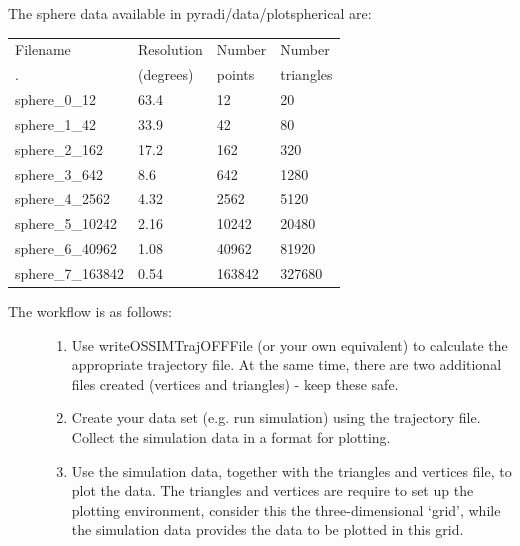 \documentclass[a4paper,10pt,english]{sphinxmanual}
\begin{document}
The sphere data available in pyradi/data/plotspherical are:

\begin{tabulary}{\linewidth}{|L|L|L|L|}
\hline
\textsf{\relax 
Filename
} & \textsf{\relax 
Resolution
} & \textsf{\relax 
Number
} & \textsf{\relax 
Number
}\\
\textsf{\relax 
.
} & \textsf{\relax 
(degrees)
} & \textsf{\relax 
points
} & \textsf{\relax 
triangles
}\\
\hline
sphere\_0\_12
 & 
63.4
 & 
12
 & 
20
\\

sphere\_1\_42
 & 
33.9
 & 
42
 & 
80
\\

sphere\_2\_162
 & 
17.2
 & 
162
 & 
320
\\

sphere\_3\_642
 & 
8.6
 & 
642
 & 
1280
\\

sphere\_4\_2562
 & 
4.32
 & 
2562
 & 
5120
\\

sphere\_5\_10242
 & 
2.16
 & 
10242
 & 
20480
\\

sphere\_6\_40962
 & 
1.08
 & 
40962
 & 
81920
\\

sphere\_7\_163842
 & 
0.54
 & 
163842
 & 
327680
\\
\hline\end{tabulary}

\begin{description}
\item[{The workflow is as follows:}] \leavevmode\begin{enumerate}
\item {} 
Use writeOSSIMTrajOFFFile (or your own equivalent) to
calculate the appropriate trajectory file.
At the same time, there are two additional files created
(vertices and triangles) - keep these safe.

\item {} 
Create your data set (e.g. run simulation) using the trajectory
file. Collect the simulation data in a format for plotting.

\item {} 
Use the simulation data, together with the triangles and
vertices file, to plot the data. The triangles and vertices
are require to set up the plotting environment, consider this
the three-dimensional `grid', while the simulation data
provides the data to be plotted in this grid.

\end{enumerate}

\end{description}
\end{document}
